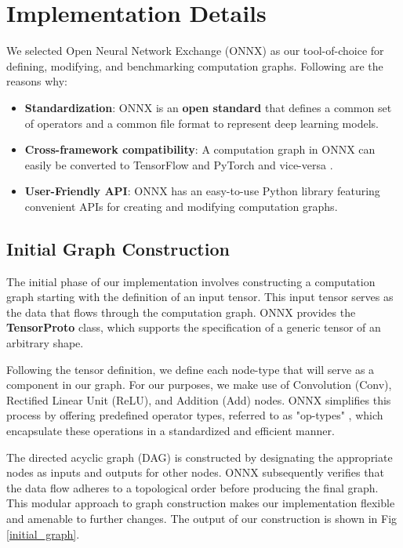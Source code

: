 \documentclass[12pt,a4paper,twoside,openright,bibliography=totocnumbered]{report}
\begin{document}
\section{Implementation Details}
		
    We selected Open Neural Network Exchange (ONNX) as our tool-of-choice for defining, modifying, and benchmarking computation graphs. Following are the reasons why:

    \begin{itemize}
        \item \textbf{Standardization}: ONNX is an \textbf{open standard} that defines a common set of operators and a common file format to represent deep learning models. 
        \item \textbf{Cross-framework compatibility}: A computation graph in ONNX can easily be converted to TensorFlow \cite{pypiOnnx2tf} and PyTorch and vice-versa \cite{pytorchdocs}\cite{githubGitHubOnnxtensorflowonnx}.
        \item \textbf{User-Friendly API}: ONNX has an easy-to-use Python library featuring convenient APIs for creating and modifying computation graphs.
    \end{itemize}
    

    \subsection{Initial Graph Construction}
    The initial phase of our implementation involves constructing a computation graph starting with the definition of an input tensor. This input tensor serves as the data that flows through the computation graph. ONNX provides the \textbf{TensorProto} class, which supports the specification of a generic tensor of an arbitrary shape.

    Following the tensor definition, we define each node-type that will serve as a component in our graph. For our purposes, we make use of Convolution (Conv), Rectified Linear Unit (ReLU), and Addition (Add) nodes. ONNX simplifies this process by offering predefined operator types, referred to as "op-types" \cite{onnxONNXOperators}, which encapsulate these operations in a standardized and efficient manner.
    
    The directed acyclic graph (DAG) is constructed by designating the appropriate nodes as inputs and outputs for other nodes. ONNX subsequently verifies that the data flow adheres to a topological order before producing the final graph. This modular approach to graph construction makes our implementation flexible and amenable to further changes. The output of our construction is shown in Fig \ref{initial_graph}.
\end{document}
